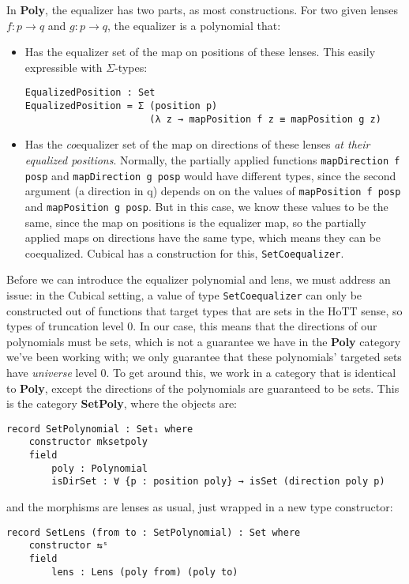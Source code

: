 In \textbf{Poly}, the equalizer has two parts, as most constructions. For two given lenses $f : p \rightarrow q$ and $g : p \rightarrow q$, the equalizer is a polynomial that:
\begin{itemize}
    \item Has the equalizer set of the map on positions of these lenses. This easily expressible with $\Sigma$-types:
    \begin{verbatim}
EqualizedPosition : Set
EqualizedPosition = Σ (position p)
                      (λ z → mapPosition f z ≡ mapPosition g z)
    \end{verbatim}
    \item Has the \textit{co}equalizer set of the map on directions of these lenses \textit{at their equalized positions}. Normally, the partially applied functions \texttt{mapDirection f posp} and \texttt{mapDirection g posp} would have different types, since the second argument (a direction in q) depends on on the values of \texttt{mapPosition f posp} and \texttt{mapPosition g posp}. But in this case, we know these values to be the same, since the map on positions is the equalizer map, so the partially applied maps on directions have the same type, which means they can be coequalized. Cubical has a construction for this, \texttt{SetCoequalizer}.
\end{itemize}

Before we can introduce the equalizer polynomial and lens, we must address an issue: in the Cubical setting, a value of type \texttt{SetCoequalizer} can only be constructed out of functions that target types that are sets in the HoTT sense, so types of truncation level 0. In our case, this means that the directions of our polynomials must be sets, which is not a guarantee we have in the \textbf{Poly} category we've been working with; we only guarantee that these polynomials' targeted sets have \textit{universe} level 0. To get around this, we work in a category that is identical to \textbf{Poly}, except the directions of the polynomials are guaranteed to be sets. This is the category \textbf{SetPoly}, where the objects are:

\begin{verbatim}
record SetPolynomial : Set₁ where
    constructor mksetpoly
    field
        poly : Polynomial
        isDirSet : ∀ {p : position poly} → isSet (direction poly p)
\end{verbatim}
and the morphisms are lenses as usual, just wrapped in a new type constructor:
\begin{verbatim}
record SetLens (from to : SetPolynomial) : Set where
    constructor ⇆ˢ
    field
        lens : Lens (poly from) (poly to)
\end{verbatim}

